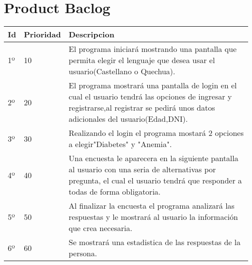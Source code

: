 \chapter{Product Baclog}



\begin{table}[htbp]
	\begin{center}
		\begin{tabular}{| p{3.2cm}| p{4.2cm} |p{7.8cm} |}
			\hline
			\textbf{Id} & \textbf {Prioridad} & \textbf{Descripcion} \\\hline    
			1º & 10 & El programa iniciará mostrando una pantalla que permita elegir el lenguaje que desea usar el usuario(Castellano o Quechua).\\ \hline
			2º & 20 & El programa mostrará una pantalla de login en el cual el usuario tendrá las opciones de ingresar y registrarse,al registrar se pedirá unos datos adicionales del usuario(Edad,DNI).\\ \hline
			3º & 30 & Realizando el login el programa mostará 2 opciones a elegir"Diabetes" y "Anemia".\\ \hline
			4º & 40 & Una encuesta le aparecera en la siguiente pantalla al usuario con una seria de alternativas por pregunta, 
			el cual el usuario tendrá que responder a todas de forma obligatoria.\\ \hline
			5º & 50 & Al finalizar la encuesta el programa analizará las respuestas y le mostrará al usuario la información que crea necesaria.\\ \hline
			6º & 60 & Se mostrará una estadistica de las respuestas de la persona.\\ \hline
		\end{tabular}
	\end{center}
\end{table}
